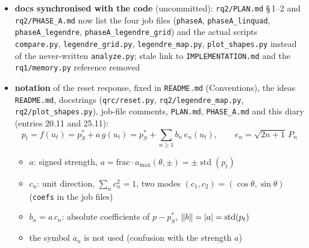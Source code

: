 \begin{sloppypar}
\begin{itemize}
\begin{itemize}
        \texttt{fair-comparison-mean-reset.md} (comparison at fixed mean $\langle p_t \rangle = p^*_S$, paired
        $\Delta C$)
        \item \texttt{/idea} skill (\texttt{.claude/skills/idea/SKILL.md}): records an idea from the main
        conversation $\to$ must run in the main session, a subagent cannot see the discussion; now also: a
        request about an existing idea goes into that entry (dated subsection), never into a new file
        \item \texttt{ideas-curator} agent: maintains the log (index, cross-links, stale code/diary references,
        duplicates)
        \item hooks in \texttt{.claude/settings.json}: \texttt{PreCompact} reminds to run \texttt{/idea} before the
        context is compacted; \texttt{SessionStart} after a compaction checks for unrecorded ideas
    \end{itemize}
    \item \textbf{docs synchronised with the code} (uncommitted): \texttt{rq2/PLAN.md} \S\,1--2 and
    \texttt{rq2/PHASE\_A.md} now list the four job files (\texttt{phaseA}, \texttt{phaseA\_linquad},
    \texttt{phaseA\_legendre}, \texttt{phaseA\_legendre\_grid}) and the actual scripts \texttt{compare.py},
    \texttt{legendre\_grid.py}, \texttt{legendre\_map.py}, \texttt{plot\_shapes.py} instead of the never-written
    \texttt{analyze.py}; stale link to \texttt{IMPLEMENTATION.md} and the \texttt{rq1/memory.py} reference removed
    \item \textbf{notation} of the reset response, fixed in \texttt{README.md} (Conventions), the ideas
    \texttt{README.md}, docstrings (\texttt{qrc/reset.py}, \texttt{rq2/legendre\_map.py}, \texttt{rq2/plot\_shapes.py}),
    job-file comments, \texttt{PLAN.md}, \texttt{PHASE\_A.md} and this diary (entries 20.11 and 25.11):
    \begin{equation*}
        p_t = f(u_t) = p^*_S + a\, g(u_t) = p^*_S + \sum_{n \ge 1} b_n\, e_n(u_t), \qquad e_n = \sqrt{2n+1}\, P_n
    \end{equation*}
    \begin{itemize}
        \item $a$: signed strength, $a = \text{frac} \cdot a_{\max}(\theta, \pm) = \pm \operatorname{std}(p_t)$
        \item $c_n$: unit direction, $\sum_n c_n^2 = 1$, two modes $(c_1, c_2) = (\cos\theta, \sin\theta)$
        (\texttt{coefs} in the job files)
        \item $b_n = a\, c_n$: absolute coefficients of $p - p^*_S$, $\norm{b} = \abs{a} = \operatorname{std}(p_t)$
        \item the symbol $a_n$ is not used (confusion with the strength $a$)
    \end{itemize}
\end{itemize}
\end{sloppypar}

